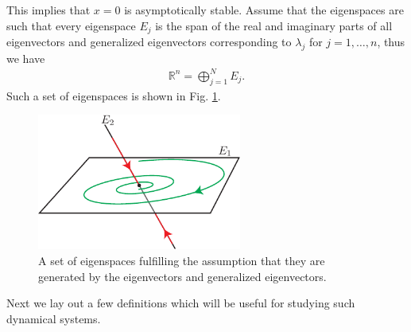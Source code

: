 This implies that $x=0$ is asymptotically stable. Assume that the eigenspaces are such that every eigenspace $E_j$ is the span of the real and imaginary parts of all eigenvectors and generalized eigenvectors corresponding to $\lambda_j$ for $j=1,\ldots,n$, thus we have
\begin{align}
\mathbb{R}^{n} = \bigoplus_{j=1}^{N}E_j	.
\end{align}
Such a set of eigenspaces is shown in Fig. \ref{fig:ponsioen_eigenspaces}.
\begin{figure}[h!]
	\centering
	\includegraphics[width=0.6\textwidth]{figures/ch9/30ponsioen_eigenspaces.pdf}
	\caption{A set of eigenspaces fulfilling the assumption that they are generated by the eigenvectors and generalized eigenvectors.}
	\label{fig:ponsioen_eigenspaces}
\end{figure}

Next we lay out a few definitions which will be useful for studying such dynamical systems.

